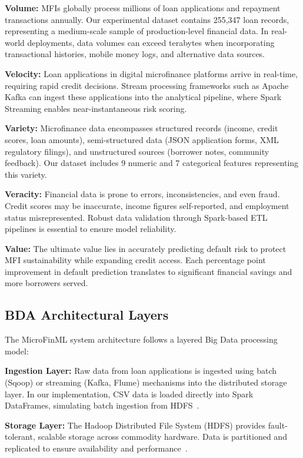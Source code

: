 \documentclass[runningheads]{llncs}
\begin{document}
\textbf{Volume:} MFIs globally process millions of loan applications and repayment transactions annually. Our experimental dataset contains 255,347 loan records, representing a medium-scale sample of production-level financial data. In real-world deployments, data volumes can exceed terabytes when incorporating transactional histories, mobile money logs, and alternative data sources.

\textbf{Velocity:} Loan applications in digital microfinance platforms arrive in real-time, requiring rapid credit decisions. Stream processing frameworks such as Apache Kafka can ingest these applications into the analytical pipeline, where Spark Streaming enables near-instantaneous risk scoring.

\textbf{Variety:} Microfinance data encompasses structured records (income, credit scores, loan amounts), semi-structured data (JSON application forms, XML regulatory filings), and unstructured sources (borrower notes, community feedback). Our dataset includes 9 numeric and 7 categorical features representing this variety.

\textbf{Veracity:} Financial data is prone to errors, inconsistencies, and even fraud. Credit scores may be inaccurate, income figures self-reported, and employment status misrepresented. Robust data validation through Spark-based ETL pipelines is essential to ensure model reliability.

\textbf{Value:} The ultimate value lies in accurately predicting default risk to protect MFI sustainability while expanding credit access. Each percentage point improvement in default prediction translates to significant financial savings and more borrowers served.

\subsection{BDA Architectural Layers}

The MicroFinML system architecture follows a layered Big Data processing model:

\textbf{Ingestion Layer:} Raw data from loan applications is ingested using batch (Sqoop) or streaming (Kafka, Flume) mechanisms into the distributed storage layer. In our implementation, CSV data is loaded directly into Spark DataFrames, simulating batch ingestion from HDFS~\cite{shvachko2010hdfs}.

\textbf{Storage Layer:} The Hadoop Distributed File System (HDFS) provides fault-tolerant, scalable storage across commodity hardware. Data is partitioned and replicated to ensure availability and performance~\cite{ghemawat2003gfs}.
\end{document}
